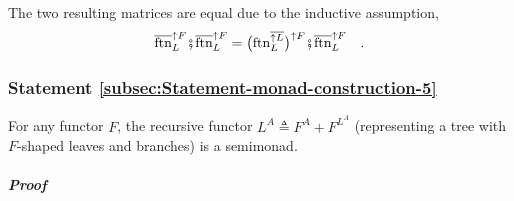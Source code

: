 The two resulting matrices are equal due to the inductive assumption,
\[
\overline{\text{ftn}}_{L}^{\uparrow F}\bef\overline{\text{ftn}}_{L}^{\uparrow F}=\big(\text{ftn}_{L}^{\overline{\uparrow L}}\big)^{\uparrow F}\bef\overline{\text{ftn}}_{L}^{\uparrow F}\quad.
\]


\subsubsection{Statement \label{subsec:Statement-monad-construction-5}\ref{subsec:Statement-monad-construction-5}}

For any functor $F$, the recursive functor $L^{A}\triangleq F^{A}+F^{L^{A}}$
(representing a tree with $F$-shaped leaves and branches) is a semimonad.

\subparagraph{Proof}

